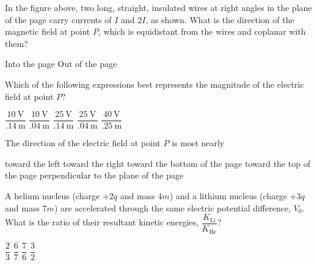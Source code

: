 \documentclass[12pt]{../../../oss-classkick-exam}
\begin{document}
\begin{questions}
  \question In the figure above, two long, straight, insulated wires at right
  angles in the plane of the page carry currents of $I$ and $2I$, as shown.
  What is the direction of the magnetic field at point $P$, which is
  equidistant from the wires and coplanar with them?
  \begin{choices}
    \choice Into the page
    \choice Out of the page
    \choice {\huge$\searrow$}
    \choice {\huge$\nwarrow$}
    \choice {\huge$\nearrow$}
  \end{choices}
  
  \question Which of the following expressions best represents the magnitude of
  the electric field at point $P$?
  \label{contour1}
  \begin{choices}
    \choice $\dfrac{\SI{10}{\volt}}{\SI{.14}{\metre}}$
    \choice $\dfrac{\SI{10}{\volt}}{\SI{.04}{\metre}}$
    \choice $\dfrac{\SI{25}{\volt}}{\SI{.14}{\metre}}$
    \choice $\dfrac{\SI{25}{\volt}}{\SI{.04}{\metre}}$
    \choice $\dfrac{\SI{40}{\volt}}{\SI{.25}{\metre}}$
  \end{choices}

  \question The direction of the electric field at point $P$ is most nearly
  \label{contour2}
  \begin{choices}
    \choice toward the left
    \choice toward the right
    \choice toward the bottom of the page
    \choice toward the top of the page
    \choice perpendicular to the plane of the page
  \end{choices}
  \newpage
  
  
  \question A helium nucleus (charge $+2q$ and mass $4m$) and a lithium nucleus
  (charge $+3q$ and mass $7m$) are accelerated through the same electric
  potential difference, $V_0$. What is the ratio of their resultant
  kinetic energies, $\dfrac{K_\text{Li}}{K_\text{He}}$?
  \begin{choices}
    \choice$\dfrac23$
    \choice$\dfrac67$
    \choice$\dfrac76$
    \choice$\dfrac32$
  \end{choices}
  \uplevel{ \rule{\linewidth}{.5pt}}
  

\end{questions}
\end{document}
